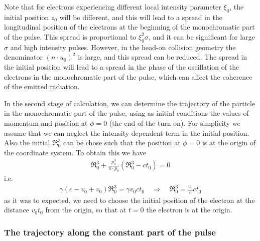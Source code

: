 \begin{highlightbox}
  Note that for electrons experiencing different local intensity parameter $\xi_0$, the initial position $z_0$ will be different, and this will lead to a spread in the longitudinal position of the electrons at the beginning of the monochromatic part of the pulse. This spread is proportional to $\xi_0^2\sigma$, and it can be significant for large $\sigma$ and high intensity pulses. However, in the head-on collision geometry the denominator $(n\cdot u_0)^2$ is large, and this spread can be reduced. The spread in the initial position will lead to a spread in the phase of the oscillation of the electrons in the monochromatic part of the pulse, which can affect the coherence of the emitted radiation.
\end{highlightbox}

In the second stage of calculation, we can determine the trajectory of the particle in the monochromatic part of the pulse, using as initial conditions the values of momentum and position at $\phi=0$ (the end of the turn-on). For simplicity we assume that we can neglect the intensity dependent term in the initial position. Also the initial $\mathfrak{R}_{0}^{3}$ can be  chose such that the position at $\phi=0$ is at the origin of the coordinate system. To obtain this we have
\begin{align}
  {\mathfrak R}_0^3+\frac{p_0^3}{n\cdot p_0}({\mathfrak{R}}_0^3 - ct_0) =0
\end{align}
i.e.
\begin{align}
  \gamma(c - v_0+v_0) {\mathfrak{R}}_0^3 = \gamma v_0 ct_0 \quad \Rightarrow \quad {\mathfrak{R}}_0^3 = \frac{v_0}{c} ct_0
\end{align}
as it was to expected, we need to choose the initial position of the electron at the distance $v_0 t_0$ from the origin, so that at $t=0$ the electron is at the origin.

\subsubsection{The trajectory along the constant part of the pulse}


